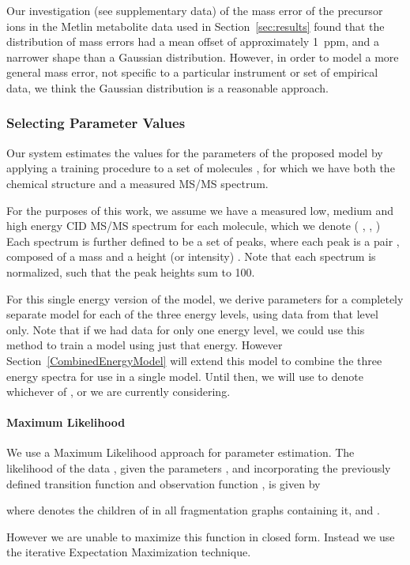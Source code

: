 Our investigation (see supplementary data) of the mass error of the precursor ions in the Metlin metabolite data used in Section~\ref{sec:results} found that the distribution of mass errors 
had a mean offset of approximately 1~ppm, and a narrower shape than a Gaussian distribution.
However, in order to model a more general mass error, not specific to a particular instrument or set of empirical data, we think the Gaussian distribution is a reasonable approach.

\subsubsection{Selecting Parameter Values}
\label{SimpleSelectingParams}

Our system estimates the values for the parameters  of the proposed model by applying a training procedure to a set of molecules , for which we have both the chemical structure and a measured MS/MS spectrum. 

For the purposes of this work, we assume we have a measured low, medium and high energy CID MS/MS spectrum for each molecule, which we denote  
( , , ) 
Each spectrum is further defined to be a set of peaks, where each peak is a pair , composed of a mass  and a height (or intensity) . Note that each spectrum is normalized, such that the peak heights sum to 100.

For this single energy version of the model, we derive parameters for a completely separate model for each of the three energy levels, using data from that level only.
Note that if we had data for only one energy level, we could use this method to train a model using just that energy. 
However Section~\ref{CombinedEnergyModel} will extend this model to combine the three energy spectra for use in a single model. 
Until then, we will use  to denote whichever of ,  or  we are currently considering.

\paragraph{Maximum Likelihood}
We use a Maximum Likelihood approach for parameter estimation.
The likelihood of the data , given the parameters ,  
and incorporating the previously defined transition function  and observation function , is given by

where  denotes the children of  in all fragmentation graphs containing it, and .

However we are unable to maximize this function in closed form. 
Instead we use the iterative Expectation Maximization \citep{Dempster1977} technique.

